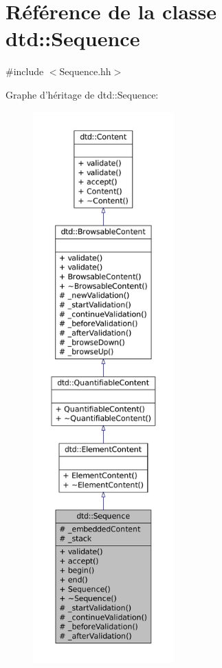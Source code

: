 \hypertarget{classdtd_1_1_sequence}{
\section{Référence de la classe dtd::Sequence}
\label{classdtd_1_1_sequence}
}


{\ttfamily \#include $<$Sequence.hh$>$}



Graphe d'héritage de dtd::Sequence:\nopagebreak
\begin{figure}[H]
\begin{center}
\leavevmode
\includegraphics[height=600pt]{classdtd_1_1_sequence__inherit__graph}
\end{center}
\end{figure}


